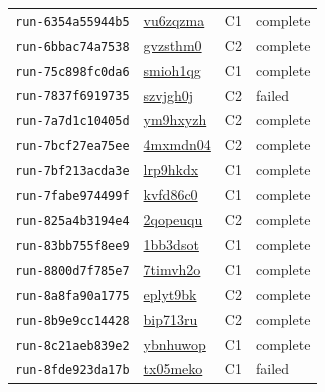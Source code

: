 \begin{longtable}{llll}
\texttt{run-6354a55944b5} & \href{https://forge.coreweave.com/wandb/lbxa-corp/collusion-benchmark/runs/vu6zqzma}{vu6zqzma} & C1 & complete \\
\texttt{run-6bbac74a7538} & \href{https://forge.coreweave.com/wandb/lbxa-corp/collusion-benchmark/runs/gvzsthm0}{gvzsthm0} & C2 & complete \\
\texttt{run-75c898fc0da6} & \href{https://forge.coreweave.com/wandb/lbxa-corp/collusion-benchmark/runs/smioh1qg}{smioh1qg} & C1 & complete \\
\texttt{run-7837f6919735} & \href{https://forge.coreweave.com/wandb/lbxa-corp/collusion-benchmark/runs/szvjgh0j}{szvjgh0j} & C2 & failed \\
\texttt{run-7a7d1c10405d} & \href{https://forge.coreweave.com/wandb/lbxa-corp/collusion-benchmark/runs/ym9hxyzh}{ym9hxyzh} & C2 & complete \\
\texttt{run-7bcf27ea75ee} & \href{https://forge.coreweave.com/wandb/lbxa-corp/collusion-benchmark/runs/4mxmdn04}{4mxmdn04} & C2 & complete \\
\texttt{run-7bf213acda3e} & \href{https://forge.coreweave.com/wandb/lbxa-corp/collusion-benchmark/runs/lrp9hkdx}{lrp9hkdx} & C1 & complete \\
\texttt{run-7fabe974499f} & \href{https://forge.coreweave.com/wandb/lbxa-corp/collusion-benchmark/runs/kvfd86c0}{kvfd86c0} & C1 & complete \\
\texttt{run-825a4b3194e4} & \href{https://forge.coreweave.com/wandb/lbxa-corp/collusion-benchmark/runs/2qopeuqu}{2qopeuqu} & C2 & complete \\
\texttt{run-83bb755f8ee9} & \href{https://forge.coreweave.com/wandb/lbxa-corp/collusion-benchmark/runs/1bb3dsot}{1bb3dsot} & C1 & complete \\
\texttt{run-8800d7f785e7} & \href{https://forge.coreweave.com/wandb/lbxa-corp/collusion-benchmark/runs/7timvh2o}{7timvh2o} & C1 & complete \\
\texttt{run-8a8fa90a1775} & \href{https://forge.coreweave.com/wandb/lbxa-corp/collusion-benchmark/runs/eplyt9bk}{eplyt9bk} & C2 & complete \\
\texttt{run-8b9e9cc14428} & \href{https://forge.coreweave.com/wandb/lbxa-corp/collusion-benchmark/runs/bip713ru}{bip713ru} & C2 & complete \\
\texttt{run-8c21aeb839e2} & \href{https://forge.coreweave.com/wandb/lbxa-corp/collusion-benchmark/runs/ybnhuwop}{ybnhuwop} & C1 & complete \\
\texttt{run-8fde923da17b} & \href{https://forge.coreweave.com/wandb/lbxa-corp/collusion-benchmark/runs/tx05meko}{tx05meko} & C1 & failed \\

\end{longtable}

